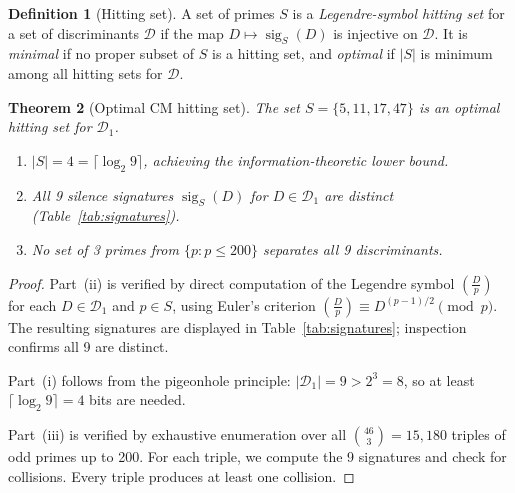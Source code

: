 \documentclass[11pt]{amsart}
\newtheorem{theorem}{Theorem}[section]
\theoremstyle{definition}
\newtheorem{definition}[theorem]{Definition}
\begin{document}
\begin{definition}[Hitting set]\label{def:hitting}
A set of primes $S$ is a \emph{Legendre-symbol hitting set} for a set of discriminants $\mathcal{D}$ if the map $D \mapsto \operatorname{sig}_S(D)$ is injective on $\mathcal{D}$. It is \emph{minimal} if no proper subset of $S$ is a hitting set, and \emph{optimal} if $|S|$ is minimum among all hitting sets for $\mathcal{D}$.
\end{definition}

\begin{theorem}[Optimal CM hitting set]\label{thm:main}
The set $S = \{5, 11, 17, 47\}$ is an optimal hitting set for $\mathcal{D}_1$.
\begin{enumerate}[label=(\roman*)]
\item $|S| = 4 = \lceil \log_2 9 \rceil$, achieving the information-theoretic lower bound.
\item All 9 silence signatures $\operatorname{sig}_S(D)$ for $D \in \mathcal{D}_1$ are distinct (Table~\ref{tab:signatures}).
\item No set of 3 primes from $\{p : p \leq 200\}$ separates all 9 discriminants.
\end{enumerate}
\end{theorem}

\begin{proof}
Part~(ii) is verified by direct computation of the Legendre symbol $\left(\frac{D}{p}\right)$ for each $D \in \mathcal{D}_1$ and $p \in S$, using Euler's criterion $\left(\frac{D}{p}\right) \equiv D^{(p-1)/2} \pmod{p}$. The resulting signatures are displayed in Table~\ref{tab:signatures}; inspection confirms all 9 are distinct.

Part~(i) follows from the pigeonhole principle: $|\mathcal{D}_1| = 9 > 2^3 = 8$, so at least $\lceil \log_2 9 \rceil = 4$ bits are needed.

Part~(iii) is verified by exhaustive enumeration over all $\binom{46}{3} = 15{,}180$ triples of odd primes up to 200. For each triple, we compute the 9 signatures and check for collisions. Every triple produces at least one collision. \qedhere
\end{proof}
\end{document}

